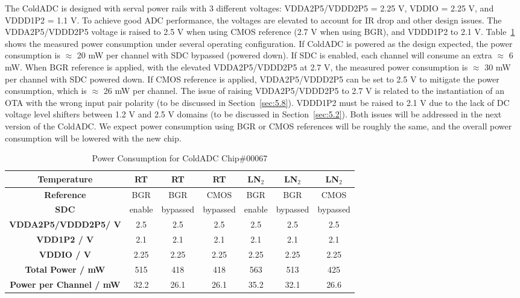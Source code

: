 \label{sec:4.6}


The ColdADC is designed with serval power rails with 3 different voltages: VDDA2P5/VDDD2P5 = 2.25 V, VDDIO = 2.25 V, 
and VDDD1P2 = 1.1 V. To achieve good ADC performance, the voltages are elevated to account for IR drop and other
design issues. The  VDDA2P5/VDDD2P5 voltage is raised to 2.5 V when using CMOS reference (2.7 V when using BGR), and 
VDDD1P2 to 2.1 V.
Table~\ref{tab:powerconsumed} shows the measured power consumption under several operating configuration. If ColdADC is powered as 
the design expected, the power consumption is $\approx$ 20 mW per channel with SDC  bypassed (powered down).  If SDC is enabled, 
each channel will consume an extra $\approx$ 6 mW.  When BGR reference is applied, with the elevated VDDA2P5/VDDD2P5 at 2.7 V, the measured
power consumption is $\approx$ 30 mW per channel with SDC powered down.  If CMOS reference is applied, VDDA2P5/VDDD2P5 can be set to 
2.5 V to mitigate the power consumption, which is $\approx$ 26 mW per channel. The issue of raising VDDA2P5/VDDD2P5 to 2.7 V is 
related to the instantiation of an OTA with the wrong input pair polarity (to be discussed in Section~\ref{sec:5.8}).  VDDD1P2 must 
be raised to 2.1 V due to the lack of DC voltage level shifters between 1.2 V and 2.5 V domains (to be discussed in Section~\ref{sec:5.2}). 
Both issues will be addressed in the next version of the ColdADC. We expect power consumption using 
BGR or CMOS references will be roughly the same, and the overall power consumption will be lowered with the new chip.
\begin{table}[h]
\centering
\begin{tabular}{|c|c|c|c|c|c|c|}
\hline
\textbf{Temperature} & RT & RT & RT & LN$_2$ & LN$_2$ & LN$_2$ \\ \hline
\textbf{Reference} & BGR & BGR & CMOS & BGR & BGR & CMOS \\ \hline
\textbf{SDC} & enable & bypassed & bypassed & enable & bypassed & bypassed \\ \hline
\textbf{VDDA2P5/VDDD2P5/ V} & 2.5 &2.5 &2.5 &2.5 &2.5 &2.5 \\ \hline
\textbf{VDD1P2 / V} & 2.1 & 2.1 & 2.1 & 2.1 & 2.1 & 2.1 \\ \hline
\textbf{VDDIO / V} & 2.25 & 2.25 & 2.25 & 2.25 & 2.25 & 2.25  \\ \hline
\textbf{Total Power / mW} & 515 & 418 & 418 & 563 & 513 & 425 \\ \hline
\textbf{Power per Channel / mW} & 32.2 & 26.1 & 26.1 & 35.2 & 32.1 & 26.6 \\ \hline
\end{tabular}
\caption{Power Consumption for ColdADC Chip\#00067}
\label{tab:powerconsumed}
\end{table}  

